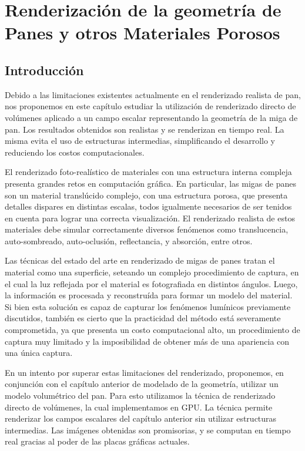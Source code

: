 
\chapter[Renderización de la geometría de Panes]{Renderización de la geometría de Panes y otros Materiales Porosos}
\section{Introducción}
Debido a las limitaciones existentes actualmente en el renderizado realista de pan, nos proponemos en este capítulo estudiar la utilización de renderizado directo de volúmenes aplicado a un campo escalar representando la geometría de la miga de pan. 
Los resultados obtenidos son realistas y se renderizan en tiempo real. La misma evita el uso de estructuras intermedias, simplificando el desarrollo y reduciendo los costos computacionales.

El renderizado foto-realístico de materiales con una estructura interna compleja presenta grandes retos en computación gráfica.
En particular, las migas de panes son un material translúcido complejo, con una estructura porosa, que presenta detalles dispares en distintas escalas, todos igualmente necesarios de ser tenidos en cuenta para lograr una correcta visualización.
El renderizado realista de estos materiales debe simular correctamente diversos fenómenos como translucencia, auto-sombreado, auto-oclusión, reflectancia, y absorción, entre otros.

Las técnicas del estado del arte en renderizado de migas de panes tratan el material como una superficie, seteando un complejo procedimiento de captura, en el cual la luz reflejada por el material es fotografiada en distintos ángulos.
Luego, la información es procesada y reconstruída para formar un modelo del material.
Si bien esta solución es capaz de capturar los fenómenos lumínicos previamente discutidos, también es cierto que la practicidad del método está severamente comprometida, ya que presenta un costo computacional alto, un procedimiento de captura muy limitado y la imposibilidad de obtener más de una apariencia con una única captura.

En un intento por superar estas limitaciones del renderizado, proponemos, en conjunción con el capítulo anterior de modelado de la geometría, utilizar un modelo volumétrico del pan.
Para esto utilizamos la técnica de renderizado directo de volúmenes, la cual implementamos en \acrshort{GPU}.
La técnica permite renderizar los campos escalares del capítulo anterior sin utilizar estructuras intermedias.
Las imágenes obtenidas son promisorias, y se computan en tiempo real gracias al poder de las placas gráficas actuales.


